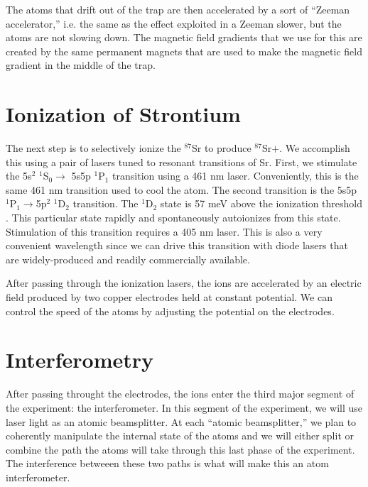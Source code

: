 The atoms that drift out of the trap are then accelerated by a sort of ``Zeeman accelerator,'' i.e. the same as the effect exploited in a Zeeman slower, but the atoms are not slowing down. The magnetic field gradients that we use for this are created by the same permanent magnets that are used to make the magnetic field gradient in the middle of the trap.

\section{Ionization of Strontium}
 
The next step is to selectively ionize the $^{87}$Sr to produce $^{87}$Sr$+$. We accomplish this using a pair of lasers tuned to resonant transitions of Sr. First, we stimulate the 5s$^2$ $^1$S$_0 \rightarrow$ 5s5p $^1$P$_1$ transition using a 461 nm laser. Conveniently, this is the same 461 nm transition used to cool the atom. The second transition is the 5s5p $^1$P$_1\rightarrow$5p$^2$ $^1$D$_2$ transition. The $^1$D$_2$ state is 57 meV above the ionization threshold \cite{NSFprop}. This particular state rapidly and spontaneously autoionizes from this state. Stimulation of this transition requires a 405 nm laser. This is also a very convenient wavelength since we can drive this transition with diode lasers that are widely-produced and readily commercially available.

After passing through the ionization lasers, the ions are accelerated by an electric field produced by two copper electrodes held at constant potential. We can control the speed of the atoms by adjusting the potential on the electrodes.%

\section{Interferometry}

After passing throught the electrodes, the ions enter the third major segment of the experiment: the interferometer. In this segment of the experiment, we will use laser light as an atomic beamsplitter. At each ``atomic beamsplitter,'' we plan to coherently manipulate the internal state of the atoms and we will either split or combine the path the atoms will take through this last phase of the experiment. The interference betweeen these two paths is what will make this an atom interferometer.

